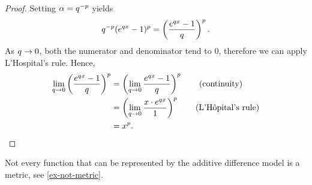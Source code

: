 \begin{proof}
	Setting $\alpha = q ^{-p}$ yields
	$$ q ^{-p}(e^{q x} - 1)^p = \left( \frac{e^{q x} -1}{q } \right)^p .$$
	As $q  \rightarrow 0$, both the numerator and denominator tend to $0$, therefore we can apply L'Hospital's rule.
	Hence,
	\begin{align*}
		\lim_{q  \rightarrow 0} \left( \frac{e^{q x} -1}{q } \right)^p & = \left( \lim_{q  \rightarrow 0} \frac{e^{q x} -1}{q } \right)^p \tag{continuity}              \\
		                                                                   & = \left( \lim_{q  \rightarrow 0} \frac{x \cdot e^{q x}}{1} \right)^p \tag{L'Hôpital's rule} \\
		                                                                   & = x^p.
	\end{align*}
\end{proof}


Not every function that can be represented by the additive difference model is a metric, see \cref{ex-not-metric}.


